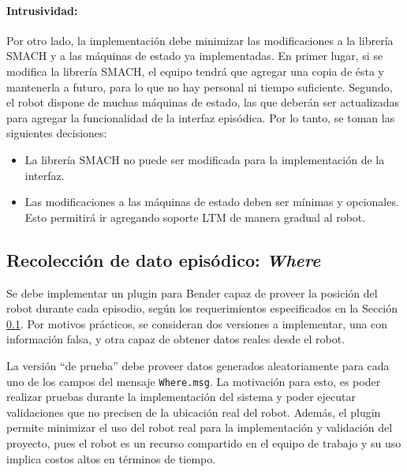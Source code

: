\paragraph{Intrusividad:}
Por otro lado, la implementación debe minimizar las modificaciones a la librería SMACH y a las máquinas de estado ya implementadas. En primer lugar, si se modifica la librería SMACH, el equipo tendrá que agregar una copia de ésta y mantenerla a futuro, para lo que no hay personal ni tiempo suficiente. Segundo, el robot dispone de muchas máquinas de estado, las que deberán ser actualizadas para agregar la funcionalidad de la interfaz episódica. Por lo tanto, se toman las siguientes decisiones:
\begin{itemize}
\item La librería SMACH no puede ser modificada para la implementación de la interfaz.
\item Las modificaciones a las máquinas de estado deben ser mínimas y opcionales. Esto permitirá ir agregando soporte LTM de manera gradual al robot.
\end{itemize}


\subsection{Recolección de dato episódico: \textit{Where}}

Se debe implementar un plugin para Bender capaz de proveer la posición del robot durante cada episodio, según los requerimientos especificados en la Sección \ref{}. Por motivos prácticos, se consideran dos versiones a implementar, una con información falsa, y otra capaz de obtener datos reales desde el robot.

La versión ``de prueba'' debe proveer datos generados aleatoriamente para cada uno de los campos del mensaje \texttt{Where.msg}. La motivación para esto, es poder realizar pruebas durante la implementación del sistema y poder ejecutar validaciones que no precisen de la ubicación real del robot. Además, el plugin permite minimizar el uso del robot real para la implementación y validación del proyecto, pues el robot es un recurso compartido en el equipo de trabajo y su uso implica costos altos en términos de tiempo.


